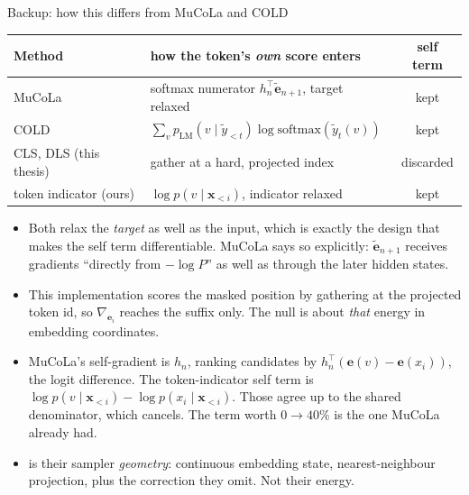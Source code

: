 \documentclass{beamer}
\begin{document}
\begin{frame}[noframenumbering]{Backup: how this differs from MuCoLa and COLD}
  \scriptsize
  \setlength{\tabcolsep}{4pt}
  \begin{center}
  \begin{tabular}{llc}
    \toprule
    Method & how the token's \emph{own} score enters & self term \\
    \midrule
    MuCoLa & softmax numerator $h_n^\top \tilde{\bm{e}}_{n+1}$, target relaxed & \textcolor{imsteal}{kept} \\
    COLD & $\sum_v p_{\text{LM}}(v\mid\tilde{y}_{<t})\log\mathrm{softmax}(\tilde{y}_t(v))$ & \textcolor{imsteal}{kept} \\
    CLS, DLS (this thesis) & gather at a hard, projected index & \textcolor{imsred}{discarded} \\
    token indicator (ours) & $\log p(v\mid \bm{x}_{<i})$, indicator relaxed & \textcolor{imsteal}{kept} \\
    \bottomrule
  \end{tabular}
  \end{center}
  \vspace{0.4em}
  \begin{itemize}
    \item {} Both relax the \emph{target} as well as the
      input, which is exactly the design that makes the self term differentiable. MuCoLa says so
      explicitly: $\tilde{\bm{e}}_{n+1}$ receives gradients ``directly from $-\log P$'' as well as
      through the later hidden states.
    \item {} This implementation scores the masked position by
      gathering at the projected token id, so $\nabla_{\bm{e}_i}$ reaches the suffix only. The null is
      about \emph{that} energy in embedding coordinates.
    \item {} MuCoLa's self-gradient is $h_n$, ranking
      candidates by $h_n^\top(\bm{e}(v)-\bm{e}(x_i))$, the logit difference. The token-indicator self
      term is $\log p(v\mid\bm{x}_{<i}) - \log p(x_i\mid\bm{x}_{<i})$. Those agree up to the shared
      denominator, which cancels. The term worth $0 \to 40\%$ is the one MuCoLa already had.
    \item {} is their sampler \emph{geometry}: continuous
      embedding state, nearest-neighbour projection, plus the correction they omit. Not their energy.
  \end{itemize}
\end{frame}
\end{document}
